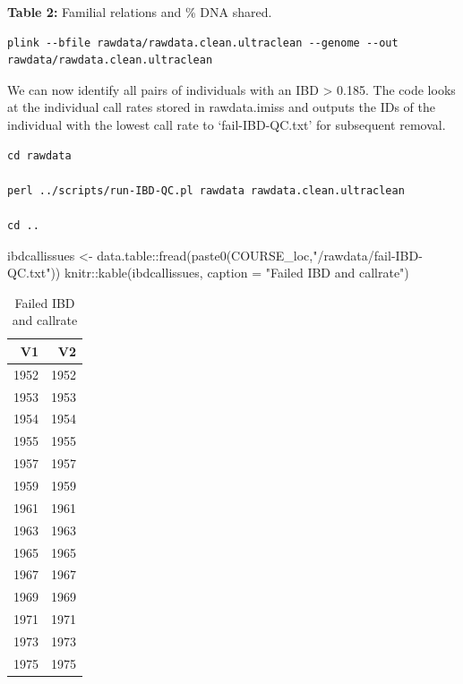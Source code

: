 \documentclass[
]{book}
\newenvironment{Shaded}{\begin{snugshade}}{\end{snugshade}}
\newcommand{\AttributeTok}[1]{\textcolor[rgb]{0.77,0.63,0.00}{#1}}
\newcommand{\FunctionTok}[1]{\textcolor[rgb]{0.00,0.00,0.00}{#1}}
\newcommand{\NormalTok}[1]{#1}
\newcommand{\OtherTok}[1]{\textcolor[rgb]{0.56,0.35,0.01}{#1}}
\newcommand{\SpecialCharTok}[1]{\textcolor[rgb]{0.00,0.00,0.00}{#1}}
\newcommand{\StringTok}[1]{\textcolor[rgb]{0.31,0.60,0.02}{#1}}
\begin{document}
\textbf{Table 2:} Familial relations and \% DNA shared.

\begin{verbatim}
plink --bfile rawdata/rawdata.clean.ultraclean --genome --out rawdata/rawdata.clean.ultraclean
\end{verbatim}

We can now identify all pairs of individuals with an IBD \textgreater{} 0.185. The code looks at the individual call rates stored in rawdata.imiss and outputs the IDs of the individual with the lowest call rate to `fail-IBD-QC.txt' for subsequent removal.

\begin{verbatim}
cd rawdata

perl ../scripts/run-IBD-QC.pl rawdata rawdata.clean.ultraclean

cd ..
\end{verbatim}

\begin{Shaded}
\begin{Highlighting}[]
\NormalTok{ibdcallissues }\OtherTok{\textless{}{-}}\NormalTok{ data.table}\SpecialCharTok{::}\FunctionTok{fread}\NormalTok{(}\FunctionTok{paste0}\NormalTok{(COURSE\_loc,}\StringTok{"/rawdata/fail{-}IBD{-}QC.txt"}\NormalTok{))}
\NormalTok{knitr}\SpecialCharTok{::}\FunctionTok{kable}\NormalTok{(ibdcallissues, }\AttributeTok{caption =} \StringTok{"Failed IBD and callrate"}\NormalTok{)}
\end{Highlighting}
\end{Shaded}

\begin{table}

\caption{\label{tab:unnamed-chunk-5}Failed IBD and callrate}
\centering
\begin{tabular}[t]{r|r}
\hline
V1 & V2\\
\hline
1952 & 1952\\
\hline
1953 & 1953\\
\hline
1954 & 1954\\
\hline
1955 & 1955\\
\hline
1957 & 1957\\
\hline
1959 & 1959\\
\hline
1961 & 1961\\
\hline
1963 & 1963\\
\hline
1965 & 1965\\
\hline
1967 & 1967\\
\hline
1969 & 1969\\
\hline
1971 & 1971\\
\hline
1973 & 1973\\
\hline
1975 & 1975\\
\hline
\end{tabular}
\end{table}
\end{document}

